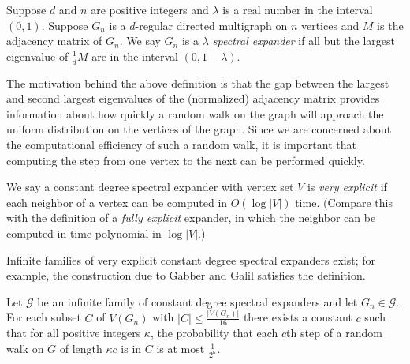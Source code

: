 \documentclass{article}
\begin{document}
\begin{definition}
  Suppose $d$ and $n$ are positive integers and $\lambda$ is a real number in the interval $(0, 1)$.
  Suppose $G_n$ is a $d$-regular directed multigraph on $n$ vertices and $M$ is the adjacency matrix of $G_n$.
  We say $G_n$ is a \emph{$\lambda$ spectral expander} if all but the largest eigenvalue of $\frac{1}{d}M$ are in the interval $(0, 1 - \lambda)$.
\end{definition}

The motivation behind the above definition is that the gap between the largest and second largest eigenvalues of the (normalized) adjacency matrix provides information about how quickly a random walk on the graph will approach the uniform distribution on the vertices of the graph.
Since we are concerned about the computational efficiency of such a random walk, it is important that computing the step from one vertex to the next can be performed quickly.

\begin{definition}
  We say a constant degree spectral expander with vertex set $V$ is \emph{very explicit} if each neighbor of a vertex can be computed in $O(\log |V|)$ time.
  (Compare this with the definition of a \emph{fully explicit} expander, in which the neighbor can be computed in time polynomial in $\log |V|$.)
\end{definition}

Infinite families of very explicit constant degree spectral expanders exist; for example, the construction due to Gabber and Galil \cite{gg79} satisfies the definition.

\begin{lemma}\label{lem:expander}
  Let $\mathcal{G}$ be an infinite family of constant degree spectral expanders and let $G_n \in \mathcal{G}$.
  For each subset $C$ of $V(G_n)$ with $|C| \leq \frac{|V(G_n)|}{16}$ there exists a constant $c$ such that for all positive integers $\kappa$, the probability that each $c$th step of a random walk on $G$ of length $\kappa c$ is in $C$ is at most $\frac{1}{2^\kappa}$.
\end{lemma}
\end{document}
